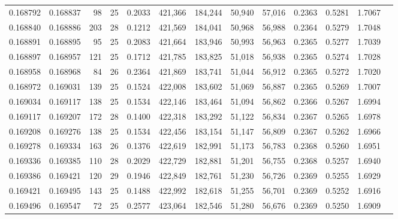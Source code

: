 \begin{tabular}{rrrrrrrrrrrrr}
0.168792 & 0.168837 &  98 &  25 &                                     0.2033 & 421,366 & 184,244 &  50,940 &  57,016 & 0.2363 & 0.5281 & 1.7067 \\
0.168840 & 0.168886 & 203 &  28 &                                     0.1212 & 421,569 & 184,041 &  50,968 &  56,988 & 0.2364 & 0.5279 & 1.7048 \\
0.168891 & 0.168895 &  95 &  25 &                                     0.2083 & 421,664 & 183,946 &  50,993 &  56,963 & 0.2365 & 0.5277 & 1.7039 \\
0.168897 & 0.168957 & 121 &  25 &                                     0.1712 & 421,785 & 183,825 &  51,018 &  56,938 & 0.2365 & 0.5274 & 1.7028 \\
0.168958 & 0.168968 &  84 &  26 &                                     0.2364 & 421,869 & 183,741 &  51,044 &  56,912 & 0.2365 & 0.5272 & 1.7020 \\
0.168972 & 0.169031 & 139 &  25 &                                     0.1524 & 422,008 & 183,602 &  51,069 &  56,887 & 0.2365 & 0.5269 & 1.7007 \\
0.169034 & 0.169117 & 138 &  25 &                                     0.1534 & 422,146 & 183,464 &  51,094 &  56,862 & 0.2366 & 0.5267 & 1.6994 \\
0.169117 & 0.169207 & 172 &  28 &                                     0.1400 & 422,318 & 183,292 &  51,122 &  56,834 & 0.2367 & 0.5265 & 1.6978 \\
0.169208 & 0.169276 & 138 &  25 &                                     0.1534 & 422,456 & 183,154 &  51,147 &  56,809 & 0.2367 & 0.5262 & 1.6966 \\
0.169278 & 0.169334 & 163 &  26 &                                     0.1376 & 422,619 & 182,991 &  51,173 &  56,783 & 0.2368 & 0.5260 & 1.6951 \\
0.169336 & 0.169385 & 110 &  28 &                                     0.2029 & 422,729 & 182,881 &  51,201 &  56,755 & 0.2368 & 0.5257 & 1.6940 \\
0.169386 & 0.169421 & 120 &  29 &                                     0.1946 & 422,849 & 182,761 &  51,230 &  56,726 & 0.2369 & 0.5255 & 1.6929 \\
0.169421 & 0.169495 & 143 &  25 &                                     0.1488 & 422,992 & 182,618 &  51,255 &  56,701 & 0.2369 & 0.5252 & 1.6916 \\
0.169496 & 0.169547 &  72 &  25 &                                     0.2577 & 423,064 & 182,546 &  51,280 &  56,676 & 0.2369 & 0.5250 & 1.6909 \\

\end{tabular}
